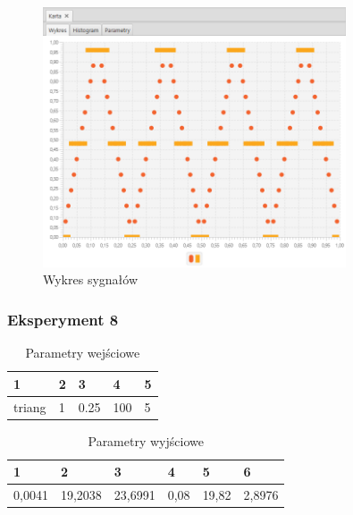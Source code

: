 \documentclass[12pt]{article}
\begin{document}
{{{                \begin{figure}[H]
                    \centering
                    \includegraphics[width=0.8\textwidth]{img/result/experiment5/07/data_draw_sampling_output_quant_output_202228.png}
                    \caption{Wykres sygnałów}
                \end{figure}
            }
            \newpage

            \subsubsection{Eksperyment 8} {
                \begin{table}[H]
                    \centering
                    \begin{tabular}{|l|l|l|l|l|}
                        \hline
                        1 & 2 & 3 & 4 & 5   \\ \hline
                        triang & 1 & 0.25 & 100 & 5  \\ \hline
                    \end{tabular}
                    \caption{Parametry wejściowe}
                \end{table}

                \begin{table}[H]
                    \centering
                    \begin{tabular}{|l|l|l|l|l|l|}
                        \hline
                        1 & 2 & 3 & 4 & 5 & 6  \\ \hline
                        0,0041 & 19,2038 & 23,6991 & 0,08 & 19,82 & 2,8976 \\ \hline
                    \end{tabular}
                    \caption{Parametry wyjściowe}
                \end{table}


}}}
\end{document}
